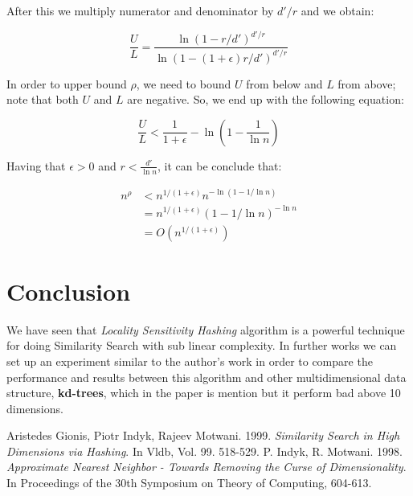 \documentclass[12pt, a4paper]{article}
\theoremstyle{definition}
\begin{document}
After this we multiply numerator and denominator by $d'/r$ and we obtain:

\begin{equation*}
  \frac{U}{L} = \frac{\ln{(1-r/{d'})^{d'/r}}}{\ln{(1-(1+\epsilon)r/{d'})^{d'/r}}}
\end{equation*}

In order to upper bound $\rho$, we need to bound $U$ from below and $L$ from above; note that both $U$ and $L$ are negative. So, we end up with the following equation:

\begin{equation*}
\frac{U}{L} < \frac{1}{1+\epsilon} - \ln{(1-\frac{1}{\ln n})}
\end{equation*}


Having that $\epsilon > 0$ and $r < \frac{d'}{\ln{n}}$, it can be conclude that:


\begin{subequations}
  \begin{align}
    n^{\rho} &< n^{1/(1+\epsilon)} n^{- \ln{(1-1/\ln n)}} \\
             &= n^{1/(1+\epsilon)} (1-1/\ln n)^{-\ln n} \\
             &= O(n^{1/(1+\epsilon)})
  \end{align}
\end{subequations}



\section{Conclusion}
We have seen that \textit{Locality Sensitivity Hashing} algorithm is a powerful technique for doing Similarity Search with sub linear complexity.
In further works we can set up an experiment similar to the author's work in order to compare the performance and results between this algorithm and other multidimensional data structure, \textbf{kd-trees}, which in the paper is mention but it perform bad above 10 dimensions.




\begin{thebibliography}{9}
  Aristedes Gionis, Piotr Indyk, Rajeev Motwani. 1999. \textit{Similarity Search in High Dimensions via Hashing}. In Vldb, Vol. 99. 518-529.
  P. Indyk, R. Motwani. 1998. \textit{Approximate Nearest Neighbor - Towards Removing the Curse of Dimensionality}. In Proceedings of the 30th Symposium on Theory of Computing, 604-613.
\end{thebibliography}
\end{document}
